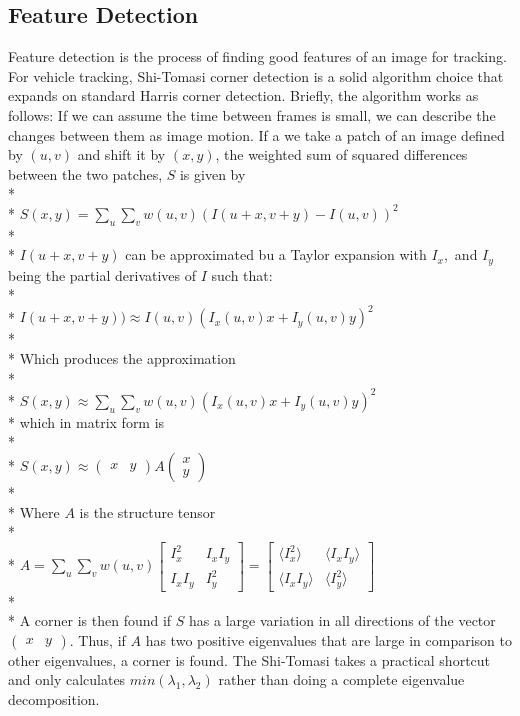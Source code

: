 \documentclass{article} %
\begin{document}
\subsection{Feature Detection}
Feature detection is the process of finding good features of an image for tracking. For vehicle tracking, Shi-Tomasi corner detection is a solid algorithm choice that expands on standard Harris corner detection. Briefly, the algorithm works as follows: If we can assume the time between frames is small, we can describe the changes between them as image motion. If a we take a patch of an image defined by $(u,v)$ and shift it by $(x,y)$, the weighted sum of squared differences between the two patches, $S$ is given by \\*
\\*
$ S(x,y) = \sum\limits_{u}\sum\limits_{v}w(u,v)(I(u+x, v+y) - I(u,v))^2$ \\*
\\*
$I(u+x,v+y)$ can be approximated bu a Taylor expansion with $I_x,$ and $I_y$ being the partial derivatives of $I$ such that:\\*
\\*
$I(u+x,v+y)) \approx I(u,v) (I_x(u,v) x+I_y(u,v) y)^2$\\*
\\*
Which produces the approximation\\*
\\*
$S(x,y) \approx \sum\limits_{u}\sum\limits_{v}w(u,v) (I_x(u,v) x+I_y(u,v) y)^2$\\*
which in matrix form is\\*
\\*
$S(x,y) \approx \left(\begin{smallmatrix}
x & y
\end{smallmatrix}\right) A
\left(\begin{smallmatrix}
x\\
y
\end{smallmatrix}\right)$\\*
\\*
Where $A$ is the structure tensor\\*
\\*
$
A = \sum_u \sum_v w(u,v) 
\begin{bmatrix}
I_x^2 & I_x I_y \\
I_x I_y & I_y^2 
\end{bmatrix}
=
\begin{bmatrix}
\langle I_x^2 \rangle & \langle I_x I_y \rangle\\
\langle I_x I_y \rangle & \langle I_y^2 \rangle
\end{bmatrix}$\\*
\\*
A corner is then found if $S$ has a large variation in all directions of the vector $\begin{pmatrix} x & y \end{pmatrix}$. Thus, if $A$ has two positive eigenvalues that are large in comparison to other eigenvalues, a corner is found. \cite{tommasini1998making} The Shi-Tomasi takes a practical shortcut and only calculates $min(\lambda_1, \lambda_2)$ rather than doing a complete eigenvalue decomposition. \cite{Shi94}
\end{document}
